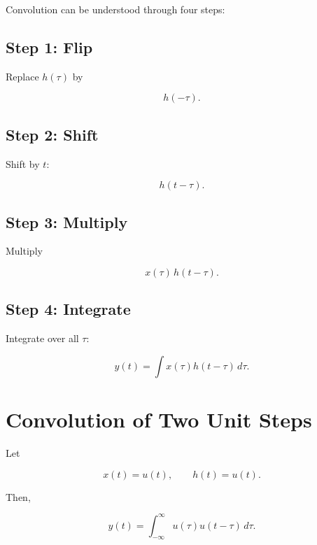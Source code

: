Convolution can be understood through four steps:


\subsection{Step 1: Flip}

Replace \(h(\tau)\) by

\[
h(-\tau).
\]


\subsection{Step 2: Shift}

Shift by \(t\):

\[
h(t-\tau).
\]


\subsection{Step 3: Multiply}

Multiply

\[
x(\tau)\,h(t-\tau).
\]


\subsection{Step 4: Integrate}

Integrate over all \(\tau\):

\[
y(t)=\int x(\tau)h(t-\tau)\,d\tau.
\]


\section{Convolution of Two Unit Steps}

Let

\[
x(t)=u(t),
\qquad
h(t)=u(t).
\]

Then,

\[
y(t)=\int_{-\infty}^{\infty}u(\tau)u(t-\tau)\,d\tau.
\]

